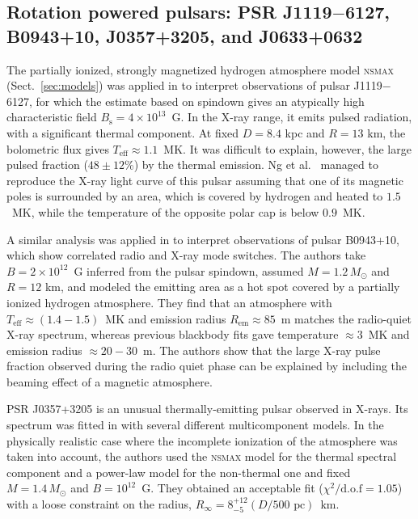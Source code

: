 \documentclass{pos1}
\newcommand{\Teff}{T_\mathrm{eff}}
\begin{document}
\subsection{Rotation powered pulsars: PSR J1119$-$6127, B0943+10, 
J0357+3205, and J0633+0632}
\label{sect:pulsarfit}

The partially ionized, strongly magnetized hydrogen atmosphere model
\textsc{nsmax} (Sect.~\ref{sec:models}) was applied in \cite{Ng_ea12}
to interpret observations of pulsar J1119$-$6127, for which
the estimate based on spindown gives an atypically high characteristic
field $B_\mathrm{s}=4\times10^{13}$~G. In the X-ray range, it emits
pulsed radiation, with a significant thermal component. At fixed
$D=8.4$ kpc and $R=13$ km, the bolometric flux gives
$\Teff\approx1.1$~MK. It was difficult to explain, however, the large
pulsed fraction ($48\pm12$\%) by the thermal emission. Ng et
al.~\cite{Ng_ea12} managed to reproduce the X-ray light curve  of this
pulsar assuming that one of its magnetic poles is surrounded by an
area, which is covered by hydrogen and heated to $1.5$~MK, while the
temperature of the opposite polar cap is below $0.9$~MK.

A similar analysis was applied in \cite{Storch_ea14} to interpret
observations of pulsar B0943+10, which show correlated radio and
X-ray mode switches. The authors take $B=2\times10^{12}$~G
inferred from the pulsar spindown, assumed $M=1.2\,M_\odot$ and $R=12$
km, and modeled the emitting area as a hot spot covered by a partially
ionized hydrogen atmosphere. They find that an atmosphere with
$\Teff\approx(1.4-1.5)$~MK and emission radius
$R_\mathrm{em}\approx85$~m matches the radio-quiet X-ray spectrum,
whereas previous blackbody fits gave temperature $\approx3$~MK and
emission radius $\approx20-30$~m. The authors show that the large
X-ray pulse fraction observed during the radio quiet phase can be
explained by including the beaming effect of a magnetic atmosphere.

PSR J0357+3205 is an unusual thermally-emitting pulsar observed in
X-rays. Its spectrum was fitted in \cite{Kirichenko_ea14} with several
different multicomponent models. In the physically realistic case
where the incomplete ionization of the atmosphere was taken into
account, the authors used the \textsc{nsmax} model for the thermal
spectral component and a power-law model for the non-thermal one and
fixed $M=1.4\,M_\odot$ and $B=10^{12}$~G. They obtained an acceptable
fit ($\chi^2/\mbox{d.o.f}=1.05$) with a loose constraint on the
radius, $R_\infty=8^{+12}_{-5} (D/500\mbox{ pc})$~km.
\end{document}
